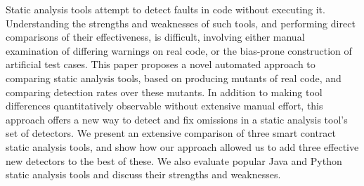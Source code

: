 Static analysis tools attempt to detect faults in code without executing it.  Understanding the strengths and weaknesses of such tools, and performing direct comparisons of their effectiveness, is difficult, involving either manual examination of differing warnings on real code, or the bias-prone construction of artificial test cases.  This paper proposes a novel automated approach to comparing static analysis tools, based on producing mutants of real code, and comparing detection rates over these mutants.  In addition to making tool differences quantitatively observable without extensive manual effort, this approach offers a new way to detect and fix omissions in a static analysis tool's set of detectors.  We present an extensive comparison of three smart contract static analysis tools, and show how our approach allowed us to add three effective new detectors to the best of these.  We also evaluate popular Java and Python static analysis tools and discuss their strengths and weaknesses.